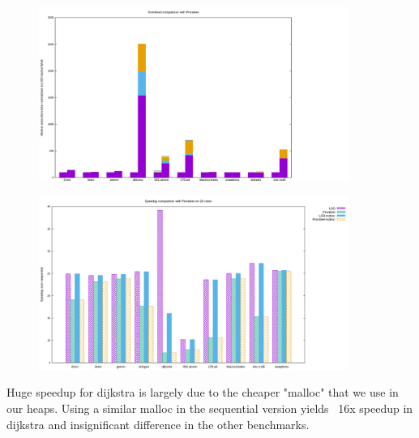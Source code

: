 \begin{figure}[htp]
  \includegraphics[width=0.9\textwidth]{figures/overheads}
\end{figure}
\begin{figure}[htp]
  \includegraphics[width=0.9\textwidth]{figures/comparison}
\end{figure}
Huge speedup for dijkstra is largely due to the cheaper "malloc" that
we use in our heaps. Using a similar malloc in the sequential version
yields ~16x speedup in dijkstra and insignificant difference in the
other benchmarks.

